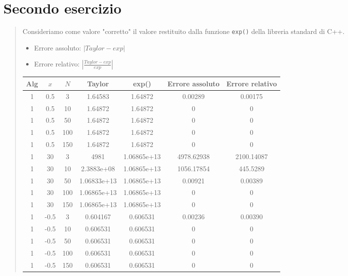 \documentclass[12pt]{article}
\begin{document}
\section{Secondo esercizio}
\begin{quote}
    Consideriamo come valore "corretto" il valore restituito dalla funzione \texttt{exp()} della libreria standard di C++.
    \begin{itemize}
        \item Errore assoluto: $|Taylor-exp|$
        \item Errore relativo: $\left |\frac{Taylor-exp}{exp}\right |$
    \end{itemize}
    \begin{tabular}{| c | c | c | c | c | c | c |}
        \hline
        \textbf{Alg} & \textbf{$x$} & \textbf{$N$} & \textbf{Taylor} & \textbf{exp()} & \textbf{Errore assoluto} & \textbf{Errore relativo}\\
        \hline
        1 & 0.5 & 3 & 1.64583 & 1.64872 & 0.00289 & 0.00175 \\
        \hline
        1 & 0.5 & 10 & 1.64872 & 1.64872 & 0 & 0 \\
        \hline
        1 & 0.5 & 50 & 1.64872 & 1.64872 & 0 & 0 \\
        \hline 
        1 & 0.5 & 100 & 1.64872 & 1.64872 & 0 & 0 \\
        \hline
        1 & 0.5 & 150 & 1.64872 & 1.64872 & 0 & 0 \\
        \hline
        1 & 30 & 3 & 4981 & 1.06865e+13 & 4978.62938 & 2100.14087 \\
        \hline
        1 & 30 & 10 & 2.3883e+08 & 1.06865e+13 & 1056.17854 & 445.5289 \\
        \hline
        1 & 30 & 50 & 1.06833e+13 & 1.06865e+13 & 0.00921 & 0.00389 \\
        \hline
        1 & 30 & 100 & 1.06865e+13 & 1.06865e+13 & 0 & 0 \\
        \hline
        1 & 30 & 150 & 1.06865e+13 & 1.06865e+13 & 0 & 0 \\
        \hline
        1 & -0.5 & 3 & 0.604167 & 0.606531 & 0.00236 & 0.00390 \\
        \hline
        1 & -0.5 & 10 & 0.606531 & 0.606531 & 0 & 0 \\
        \hline
        1 & -0.5 & 50 & 0.606531 & 0.606531 & 0 & 0 \\
        \hline
        1 & -0.5 & 100 & 0.606531 & 0.606531 & 0 & 0 \\
        \hline
        1 & -0.5 & 150 & 0.606531 & 0.606531 & 0 & 0 \\

\end{tabular}
\end{quote}
\end{document}
